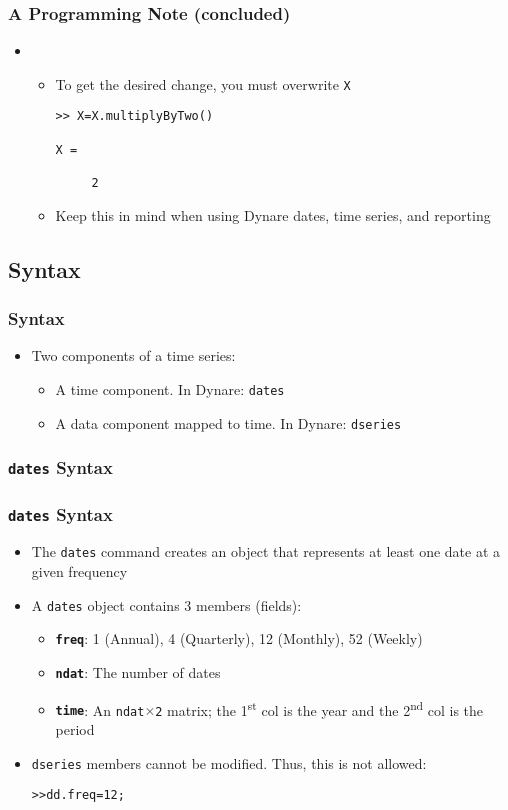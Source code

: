 \documentclass[10pt]{beamer}
\newcommand{\myitem}{\item[$\bullet$]}
\begin{document}
\begin{frame}[fragile,t]
  \frametitle{A Programming Note (concluded)}
  \begin{itemize}
    \item[] \begin{itemize}
    \myitem To get the desired change, you must overwrite \texttt{X}
\begin{verbatim}
>> X=X.multiplyByTwo()

X =

     2
\end{verbatim}
\myitem Keep this in mind when using Dynare dates, time series, and reporting
  \end{itemize}
  \end{itemize}
\end{frame}


\subsection{Syntax}
\begin{frame}[fragile,t]
  \frametitle{Syntax}
  \begin{itemize}
  \myitem Two components of a time series:
    \begin{itemize}
    \myitem A time component. In Dynare: \texttt{dates}
    \myitem A data component mapped to time. In Dynare: \texttt{dseries}
    \end{itemize}
  \end{itemize}
\end{frame}

\subsubsection{\texttt{dates} Syntax}
\begin{frame}[fragile,t]
  \frametitle{\texttt{dates} Syntax}
  \begin{itemize}
    \myitem The \texttt{dates} command creates an object that represents at least one date at a given frequency
    \myitem A \texttt{dates} object contains 3 members (fields):
    \begin{itemize}
      \myitem{\textbf{\texttt{freq}}}: 1 (Annual), 4 (Quarterly), 12 (Monthly), 52 (Weekly)
      \myitem{\textbf{\texttt{ndat}}}: The number of dates
      \myitem{\textbf{\texttt{time}}}: An \texttt{ndat$\times$2} matrix; the 1\textsuperscript{st} col is the year and the 2\textsuperscript{nd} col is the period
    \end{itemize}
    \myitem \texttt{dseries} members cannot be modified. Thus, this is not allowed:
\begin{alltt}
  >> dd.freq = 12;
\end{alltt}
  \end{itemize}
\end{frame}
\end{document}
